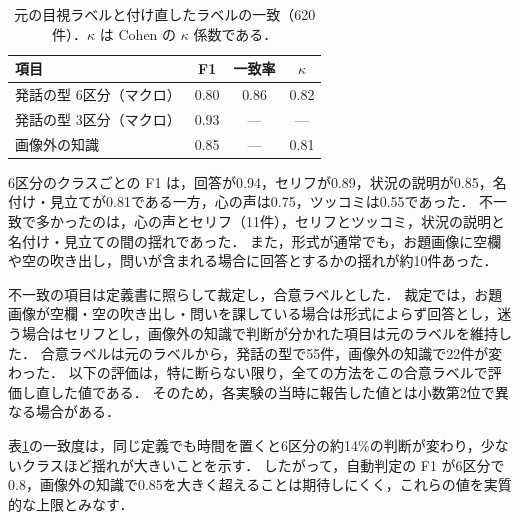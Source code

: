 \begin{table}[t]
    \centering
    \caption{元の目視ラベルと付け直したラベルの一致（620件）．$\kappa$ は Cohen の $\kappa$ 係数\cite{ref_kappa}である．}
    \label{tab_reliability}
    \small
    \begin{tabular}{lccc}
        \toprule
        項目 & F1 & 一致率 & $\kappa$ \\
        \midrule
        発話の型 6区分（マクロ） & 0.80 & 0.86 & 0.82 \\
        発話の型 3区分（マクロ） & 0.93 & --- & --- \\
        画像外の知識 & 0.85 & --- & 0.81 \\
        \bottomrule
    \end{tabular}
\end{table}

6区分のクラスごとの F1 は，回答が0.94，セリフが0.89，状況の説明が0.85，名付け・見立てが0.81である一方，心の声は0.75，ツッコミは0.55であった．
不一致で多かったのは，心の声とセリフ（11件），セリフとツッコミ，状況の説明と名付け・見立ての間の揺れであった．
また，形式が通常でも，お題画像に空欄や空の吹き出し，問いが含まれる場合に回答とするかの揺れが約10件あった．

不一致の項目は定義書に照らして裁定し，合意ラベルとした．
裁定では，お題画像が空欄・空の吹き出し・問いを課している場合は形式によらず回答とし，迷う場合はセリフとし，画像外の知識で判断が分かれた項目は元のラベルを維持した．
合意ラベルは元のラベルから，発話の型で55件，画像外の知識で22件が変わった．
以下の評価は，特に断らない限り，全ての方法をこの合意ラベルで評価し直した値である．
そのため，各実験の当時に報告した値とは小数第2位で異なる場合がある．

表\ref{tab_reliability}の一致度は，同じ定義でも時間を置くと6区分の約14\%の判断が変わり，少ないクラスほど揺れが大きいことを示す．
したがって，自動判定の F1 が6区分で0.8，画像外の知識で0.85を大きく超えることは期待しにくく，これらの値を実質的な上限とみなす．
